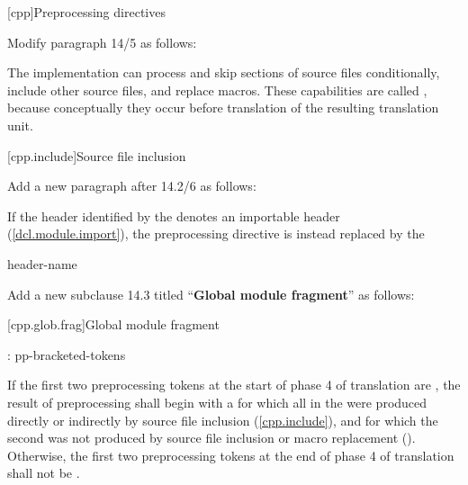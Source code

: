 \setcounter{chapter}{13}
[cpp]{Preprocessing directives}%

\begin{after}
Modify paragraph 14/5 as follows:

\begin{std.txt}
\resetalinea[4]
\alinea
The implementation can
process and skip sections of source files conditionally,
include other source files,
and replace macros.
These capabilities are called
,
because conceptually they occur
before translation of the resulting translation unit.
\end{std.txt}
\end{after}

\setcounter{section}{1}
[cpp.include]{Source file inclusion}%

\begin{after}
Add a new paragraph after 14.2/6 as follows:

\begin{std.txt}
\resetalinea[6]
\color{addclr}
\alinea
If the header identified by the 
denotes an importable header (\ref{dcl.module.import}),
the preprocessing directive
is instead replaced by the 

\begin{bnf}
 header-name \terminal{;}
\end{bnf}
\end{std.txt}
\end{after}

\noindent
Add a new subclause 14.3 titled ``\textbf{Global module fragment}'' as follows:

\setcounter{section}{2}
[cpp.glob.frag]{Global module fragment}%
\resetalinea[0]

\begin{std.txt}
\color{addclr}
\begin{bnf}
:\br
   \terminal{;} pp-bracketed-tokens 
\end{bnf}

\alinea
If the first two preprocessing tokens at the start of phase 4 of translation
are  \tcode{;}, the result of preprocessing shall begin with
a  for which all
 in the 
were produced directly or indirectly by source file inclusion
(\ref{cpp.include}), and for which the second 
 was not produced by source file inclusion or
macro replacement ().
Otherwise, the first two preprocessing tokens at the end of phase 4 of
translation shall not be  \tcode{;}.
\end{std.txt}

